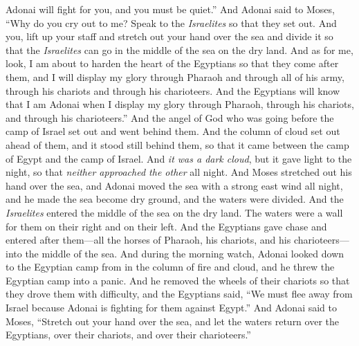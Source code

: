 \begin{biblechapter}
\verse Adonai will fight for you, and you must be quiet.”
\verse And Adonai said to Moses, “Why do you cry out to me? Speak to the \textit{Israelites} so that they set out.
\verse And you, lift up your staff and stretch out your hand over the sea and divide it so that the \textit{Israelites} can go in the middle of the sea on the dry land.
\verse And as for me, look, I am about to harden the heart of the Egyptians so that they come after them, and I will display my glory through Pharaoh and through all of his army, through his chariots and through his charioteers.
\verse And the Egyptians will know that I am Adonai when I display my glory through Pharaoh, through his chariots, and through his charioteers.”
\verse And the angel of God who was going before the camp of Israel set out and went behind them. And the column of cloud set out ahead of them, and it stood still behind them,
\verse so that it came between the camp of Egypt and the camp of Israel. And \textit{it was a dark cloud}, but it gave light to the night, so that \textit{neither approached the other} all night.
\verse And Moses stretched out his hand over the sea, and Adonai moved the sea with a strong east wind all night, and he made the sea become dry ground, and the waters were divided.
\verse And the \textit{Israelites} entered the middle of the sea on the dry land. The waters were a wall for them on their right and on their left.
\verse And the Egyptians gave chase and entered after them—all the horses of Pharaoh, his chariots, and his charioteers—into the middle of the sea.
\verse And during the morning watch, Adonai looked down to the Egyptian camp from in the column of fire and cloud, and he threw the Egyptian camp into a panic.
\verse And he removed the wheels of their chariots so that they drove them with difficulty, and the Egyptians said, “We must flee away from Israel because Adonai is fighting for them against Egypt.”
\verse And Adonai said to Moses, “Stretch out your hand over the sea, and let the waters return over the Egyptians, over their chariots, and over their charioteers.”

\end{biblechapter}
